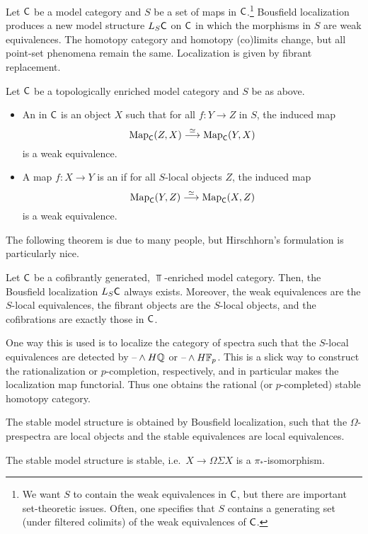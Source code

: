 Let $\mathsf C$ be a model category and $S$ be a set of maps in $\mathsf C$.\footnote{We want $S$ to contain the weak
equivalences in $\mathsf C$, but there are important set-theoretic issues. Often, one specifies that $S$ contains a
generating set (under filtered colimits) of the weak equivalences of $\mathsf C$.} Bousfield localization produces a new
model structure $L_S\mathsf C$ on $\mathsf C$ in which the morphisms in $S$ are weak equivalences. The homotopy category and
homotopy (co)limits change, but all point-set phenomena remain the same. Localization is given by fibrant
replacement.
\begin{defn}
Let $\mathsf C$ be a topologically enriched model category and $S$ be as above.
\begin{itemize}
	\item An  in $\mathsf C$ is an object $X$ such that for all $f\colon Y\to Z$ in $S$, the
	induced map
	\[\operatorname{Map}_\mathsf C(Z,X)\stackrel\simeq\longrightarrow \operatorname{Map}_\mathsf C(Y, X)\]
	is a weak equivalence.
	\item A map $f\colon X\to Y$ is an  if for all $S$-local objects $Z$, the induced map
	\[\operatorname{Map}_\mathsf C(Y,Z)\stackrel\simeq\longrightarrow \operatorname{Map}_\mathsf C(X,Z)\]
	is a weak equivalence.
\end{itemize}
\end{defn}
The following theorem is due to many people, but Hirschhorn's formulation is particularly nice.
\begin{thm}[Hirschhorn]
Let $\mathsf C$ be a cofibrantly generated, $\Top$-enriched model category. Then, the Bousfield localization $L_S\mathsf C$
always exists. Moreover, the weak equivalences are the $S$-local equivalences, the fibrant objects are the
$S$-local objects, and the cofibrations are exactly those in $\mathsf C$.
\end{thm}
\begin{exm}
One way this is used is to localize the category of spectra such that the $S$-local equivalences are detected by
$\text{--}\wedge H\mathbb Q$ or $\text{--}\wedge H\mathbb F_p$. This is a slick way to construct the rationalization or $p$-completion,
respectively, and in particular makes the localization map functorial. Thus one obtains the rational (or
$p$-completed) stable homotopy category.
\end{exm}
The stable model structure is obtained by Bousfield localization, such that the $\Omega$-prespectra are local
objects and the stable equivalences are local equivalences.
\begin{prop}
The stable model structure is stable, i.e.\ $X\to\Omega\Sigma X$ is a $\pi_*$-isomorphism.
\end{prop}
